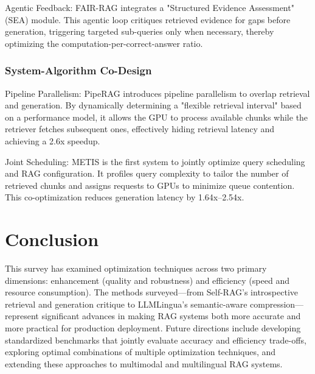 \documentclass[11pt]{article}
\begin{document}
Agentic Feedback: FAIR-RAG \citep{asl2025fair} integrates a "Structured Evidence Assessment" (SEA) module. This agentic loop critiques retrieved evidence for gaps before generation, triggering targeted sub-queries only when necessary, thereby optimizing the computation-per-correct-answer ratio.

\subsubsection{System-Algorithm Co-Design}
Pipeline Parallelism: PipeRAG \citep{jiang2024piperag} introduces pipeline parallelism to overlap retrieval and generation. By dynamically determining a "flexible retrieval interval" based on a performance model, it allows the GPU to process available chunks while the retriever fetches subsequent ones, effectively hiding retrieval latency and achieving a 2.6x speedup.

Joint Scheduling: METIS \citep{ray2025metis} is the first system to jointly optimize query scheduling and RAG configuration. It profiles query complexity to tailor the number of retrieved chunks and assigns requests to GPUs to minimize queue contention. This co-optimization reduces generation latency by 1.64x–2.54x.

\section{Conclusion}

This survey has examined optimization techniques across two primary dimensions: enhancement (quality and robustness) and efficiency (speed and resource consumption). The methods surveyed—from Self-RAG's introspective retrieval and generation critique to LLMLingua's semantic-aware compression—represent significant advances in making RAG systems both more accurate and more practical for production deployment. Future directions include developing standardized benchmarks that jointly evaluate accuracy and efficiency trade-offs, exploring optimal combinations of multiple optimization techniques, and extending these approaches to multimodal and multilingual RAG systems.




\end{document}
